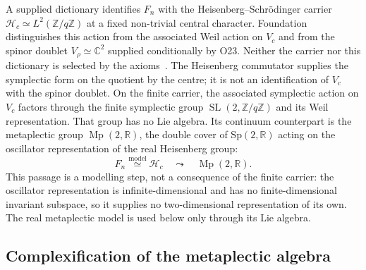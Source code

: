 \documentclass[11pt,a4paper]{article}
\theoremstyle{definition}
\theoremstyle{remark}
\newcommand{\Mp}{\operatorname{Mp}}
\newcommand{\SL}{\operatorname{SL}}
\begin{document}
    A supplied dictionary identifies $F_n$ with the Heisenberg--Schr\"odinger carrier
    $\mathcal{H}_c \simeq L^2(\mathbb{Z}/q\mathbb{Z})$ at a fixed non-trivial central character.
    Foundation distinguishes this action from the associated Weil action on $V_c$ and from the
    spinor doublet $V_\rho \simeq \mathbb{C}^2$ supplied conditionally by O23.
    Neither the carrier nor this dictionary is selected by the
    axioms~\cite{Beau2026m,Beau2026HeisenbergStructure}.
    The Heisenberg commutator supplies the symplectic form on the quotient by the centre; it is not
    an identification of $V_c$ with the spinor doublet.
    On the finite carrier, the associated symplectic action on $V_c$ factors through the finite
    symplectic group $\SL(2,\mathbb{Z}/q\mathbb{Z})$ and its Weil representation.
    That group has no Lie algebra.
    Its continuum counterpart is the metaplectic group $\Mp(2,\mathbb{R})$, the double cover of
    $\mathrm{Sp}(2,\mathbb{R})$ acting on the oscillator representation of the real Heisenberg group:
    \[
      F_n \overset{\text{model}}{\simeq} \mathcal{H}_c
      \quad\leadsto\quad
      \Mp(2,\mathbb{R}).
    \]
    This passage is a modelling step, not a consequence of the finite carrier: the oscillator
    representation is infinite-dimensional and has no finite-dimensional invariant subspace, so it
    supplies no two-dimensional representation of its own.
    The real metaplectic model is used below only through its Lie algebra.

  \subsection{Complexification of the metaplectic algebra}
    \label{ssec:lorentzian-complexification}
\end{document}
